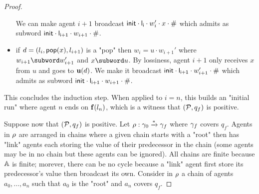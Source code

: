 \begin{proof}
\begin{itemize}
		We can make agent $i+1$ broadcast $\mathsf{init} \cdot \mathsf{l_i} \cdot w'_i \cdot x \cdot \mathsf{\#}$ which admits as subword $\mathsf{init} \cdot \mathsf{l_{i+1}} \cdot w_{i+1} \cdot \mathsf{\#}$.
		\item if $d =(l_i, \mathsf{pop}(x), l_{i+1})$ is a "pop" then $w_{i} = u \cdot w_{i+1}'$ where $w_{i+1} \subword w_{i+1}'$ and $x \subword u$. 
		By lossiness, agent $i+1$ only receives $x$ from $u$ and goes to $\mathbf{u}(d)$. We make it broadcast $\mathsf{init} \cdot \mathsf{l_{i+1}} \cdot w_{i+1}'  \cdot \mathsf{\#}$ which admits as subword $\mathsf{init} \cdot \mathsf{l_{i+1}} \cdot w_{i+1} \cdot \mathsf{\#}$.
	\end{itemize}
	This concludes the induction step.
	When applied to $i=n$, this builds an "initial run" where agent $n$ ends on $\mathbf{f}(l_n)$, which is a witness that $(\mathcal{P}, q_f)$ is positive.
	
	Suppose now that $(\mathcal{P}, q_f)$ is positive. Let $\rho: \gamma_0 \xrightarrow{*} \gamma_f$ where $\gamma_f$ covers $q_f$. Agents in $\rho$ are arranged in chains where a given chain starts with a "root" then has "link" agents each storing the value of their predecessor in the chain (some agents may be in no chain but these agents can be ignored). All chains are finite because $\mathbb{A}$ is finite; morever, there can be no cycle because a "link" agent first store its predecessor's value then broadcast its own. Consider in $\rho$ a chain of agents $a_0, \dots, a_n$ such that $a_0$ is the "root" and $a_n$ covers $q_f$. 
	

\end{proof}
